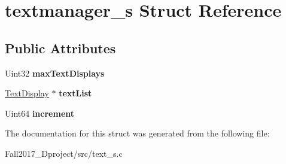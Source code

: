 \hypertarget{structtextmanager__s}{}\section{textmanager\+\_\+s Struct Reference}
\label{structtextmanager__s}
\subsection*{Public Attributes}
\begin{DoxyCompactItemize}
\item 
\mbox{\label{structtextmanager__s_a2e33d42fd6682925204bbbbe46a47505}} 
Uint32 {\bfseries max\+Text\+Displays}
\item 
\mbox{\label{structtextmanager__s_af5a1fd7df2a0bd32e7f5b2686f6c1e3c}} 
\hyperlink{structtextdisplay__s}{Text\+Display} $\ast$ {\bfseries text\+List}
\item 
\mbox{\label{structtextmanager__s_aea9f0fd0ed4673654fb6b27a53933e53}} 
Uint64 {\bfseries increment}
\end{DoxyCompactItemize}


The documentation for this struct was generated from the following file\+:\begin{DoxyCompactItemize}
\item 
Fall2017\+\_\+Dproject/src/text\+\_\+s.\+c\end{DoxyCompactItemize}
